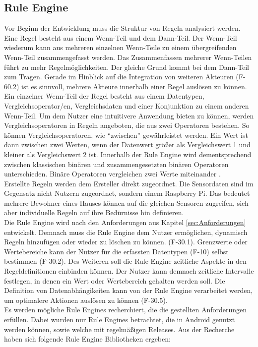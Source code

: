 \subsection{Rule Engine}
Vor Beginn der Entwicklung muss die Struktur von Regeln analysiert werden. Eine Regel besteht aus einem Wenn-Teil und dem Dann-Teil. Der Wenn-Teil wiederum kann aus mehreren einzelnen Wenn-Teile zu einem übergreifenden Wenn-Teil zusammengefasst werden. Das Zusammenfassen mehrerer Wenn-Teilen führt zu mehr Regelmöglichkeiten. Der gleiche Grund kommt bei dem Dann-Teil zum Tragen. Gerade im Hinblick auf die Integration von weiteren Akteuren (F-60.2) ist es sinnvoll, mehrere Akteure innerhalb einer Regel auslösen zu können.\\
Ein einzelner Wenn-Teil der Regel besteht aus einem Datentypen, Vergleichsoperator/en, Vergleichsdaten und einer Konjunktion zu einem anderen Wenn-Teil. Um dem Nutzer eine intuitivere Anwendung bieten zu können, werden Vergleichsoperatoren in Regeln angeboten, die aus zwei Operatoren bestehen. So können Vergleichsoperatoren, wie ``zwischen'' gewährleistet werden. Ein Wert ist dann zwischen zwei Werten, wenn der Datenwert größer als Vergleichswert 1 und kleiner als Vergleichswert 2 ist. Innerhalb der Rule Engine wird dementsprechend zwischen klassischen binären und zusammengesetzten binären Operatoren unterschieden. Binäre Operatoren vergleichen zwei Werte miteinander \cite{unilinz:binaereoperatoren}.\\
Erstellte Regeln werden dem Ersteller direkt zugeordnet. Die Sensordaten sind im Gegensatz nicht Nutzern zugeordnet, sondern einem Raspberry Pi. Das bedeutet mehrere Bewohner eines Hauses können auf die gleichen Sensoren zugreifen, sich aber individuelle Regeln auf ihre Bedürnisse hin definieren.\\
Die Rule Engine wird nach den Anforderungen aus Kapitel \ref{sec:Anforderungen} entwickelt. Demnach muss die Rule Engine dem Nutzer ermöglichen, dynamisch Regeln hinzufügen oder wieder zu löschen zu können. (F-30.1). Grenzwerte oder Wertebereiche kann der Nutzer für die erfassten Datentypen (F-10) selbst bestimmen (F-30.2). Des Weiteren soll die Rule Engine zeitliche Aspekte in den Regeldefinitionen einbinden können. Der Nutzer kann demnach zeitliche Intervalle festlegen, in denen ein Wert oder Wertebereich gehalten werden soll. Die Definition von Datenabhängikeiten kann von der Rule Engine verarbeitet werden, um optimalere Aktionen auslösen zu können (F-30.5).\\
Es werden mögliche Rule Engines recherchiert, die die gestellten Anforderungen erfüllen. Dabei wurden nur Rule Engines betrachtet, die in Android genutzt werden können, sowie welche mit regelmäßigen Releases. Aus der Recherche haben sich folgende Rule Engine Bibliotheken ergeben:
